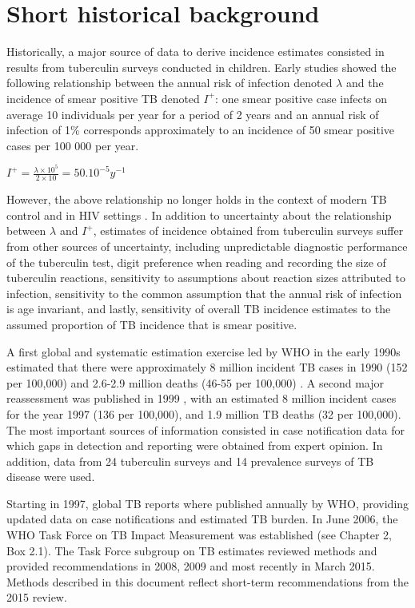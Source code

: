 \section{Short historical background}

Historically, a major source of data to derive incidence estimates consisted in results from tuberculin surveys conducted in children\cite{Styblo1985}. Early studies showed  the following relationship between the annual risk of infection denoted $\lambda$ and the incidence of smear positive TB denoted $I^+$: one smear positive case infects on average 10 individuals per year for a period of 2 years and an annual risk of infection of 1\% corresponds approximately to an incidence of 50 smear positive cases per 100 000 per year.

$I^+ = \frac{\lambda \times 10^5}{2 \times 10} = 50.10^{-5} y^{-1}$

However, the above relationship no longer holds in the context of modern TB control and in HIV settings \cite{18235886}. In addition to uncertainty about the relationship between $\lambda$ and $I^+$, estimates of incidence obtained from tuberculin surveys suffer from other sources of uncertainty, including unpredictable diagnostic performance of the tuberculin test, digit preference when reading and recording the size of tuberculin reactions, sensitivity to assumptions about reaction sizes attributed to infection, sensitivity to the common assumption that the annual risk of infection is age invariant, and lastly, sensitivity of overall TB incidence estimates to the assumed proportion of TB incidence that is smear positive. 

A first global and systematic estimation exercise led by WHO in the early 1990s estimated that there were approximately 8 million incident TB cases in 1990 (152 per 100,000) and 2.6-2.9 million deaths (46-55 per 100,000) \cite{1600578}. A second major reassessment was published in 1999 \cite{10517722}, with an estimated 8 million incident  cases for the year 1997 (136 per 100,000), and 1.9 million TB deaths (32 per 100,000). The most important sources of information consisted in case notification data for which gaps in detection and reporting were obtained from expert opinion. In addition, data from 24 tuberculin surveys and 14 prevalence surveys of TB disease were used.

Starting in 1997, global TB reports where published annually by WHO, providing updated data on case notifications and estimated TB burden. In June 2006, the WHO Task Force on TB Impact Measurement was established \cite{18201929} (see Chapter 2, Box 2.1). The Task Force subgroup on TB estimates reviewed methods and provided recommendations in 2008, 2009 and most recently in March 2015. Methods described in this document reflect short-term recommendations from the 2015 review. 




  
  
  
  
  
  
  
  
  
  
  